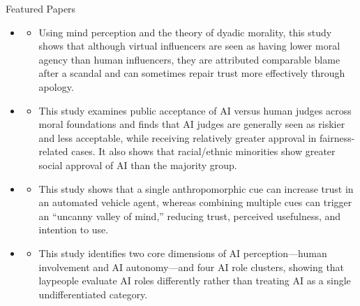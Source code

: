 \documentclass{resume} %
\begin{document}
\begin{rSection}{Featured Papers}
	
\begin{itemize}
\item {} %
\begin{itemize}
\item Using mind perception and the theory of dyadic morality, this study shows that although virtual influencers are seen as having lower moral agency than human influencers, they are attributed comparable blame after a scandal and can sometimes repair trust more effectively through apology.
\end{itemize}
\end{itemize}

\begin{itemize}
\item {} 
\begin{itemize}
\item This study examines public acceptance of AI versus human judges across moral foundations and finds that AI judges are generally seen as riskier and less acceptable, while receiving relatively greater approval in fairness-related cases. It also shows that racial/ethnic minorities show greater social approval of AI than the majority group.
\end{itemize}

\item {}
\begin{itemize}
\item This study shows that a single anthropomorphic cue can increase trust in an automated vehicle agent, whereas combining multiple cues can trigger an ``uncanny valley of mind,'' reducing trust, perceived usefulness, and intention to use.
\end{itemize}

  \item {} 
  \begin{itemize}
\item This study identifies two core dimensions of AI perception---human involvement and AI autonomy---and four AI role clusters, showing that laypeople evaluate AI roles differently rather than treating AI as a single undifferentiated category.


\end{itemize}
\end{itemize}
\end{rSection}
\end{document}
